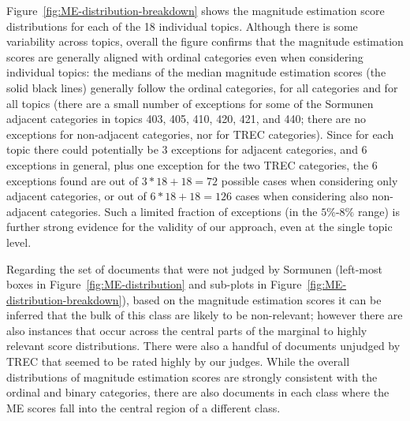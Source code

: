 Figure~\ref{fig:ME-distribution-breakdown} shows the magnitude
estimation score distributions for each of the 18 individual topics.
Although there is some variability across topics, overall the figure
confirms that the magnitude estimation scores are generally aligned
with ordinal categories even when considering individual topics: the
medians of the median magnitude estimation scores (the solid black
lines) generally follow the ordinal categories, for all categories and
for all topics (there are a small number of exceptions for some of the
Sormunen adjacent categories in topics 403, 405, 410, 420, 421, and
440; there are no exceptions for non-adjacent categories, nor for TREC
categories).
Since for each topic there could potentially be 3 exceptions for
adjacent categories, and 6 exceptions in general, plus one exception
for the two TREC categories, the 6 exceptions found are out of $3 * 18
+ 18 = 72$ possible cases when considering only adjacent categories, or
out of $6 * 18 + 18 = 126$ cases when considering also non-adjacent
categories.
Such a limited fraction of exceptions (in the $5\%$-$8\%$ range) is
further strong evidence for the validity of our approach, even at the
single topic level.

Regarding the set of documents that were not judged by Sormunen
(left-most boxes in Figure~\ref{fig:ME-distribution} and sub-plots in
Figure~\ref{fig:ME-distribution-breakdown}), based on the magnitude
estimation scores it can be inferred that the bulk of this class are
likely to be non-relevant; however there are also instances that occur
across the central parts of the marginal to highly relevant score
distributions. There were also a handful of documents unjudged by 
TREC that seemed to be rated highly by our judges.
While the overall distributions of
magnitude estimation scores are strongly consistent with the ordinal
and binary categories, there are also documents in each class 
where the ME scores 
fall into the central region of a different class.




